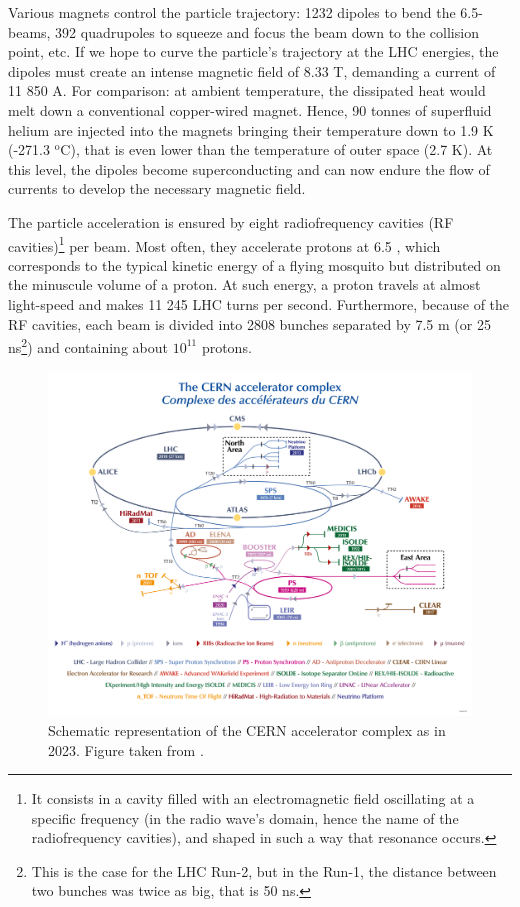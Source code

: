 Various magnets control the particle trajectory: 1232 dipoles to bend the 6.5-\tev beams, 392 quadrupoles to squeeze and focus the beam down to the collision point, etc. If we hope to curve the particle's trajectory at the LHC energies, the dipoles must create an intense magnetic field of 8.33 T, demanding a current of 11 850 A. For comparison: at ambient temperature, the dissipated heat would melt down a conventional copper-wired magnet. Hence, 90 tonnes of superfluid helium are injected into the magnets bringing their temperature down to 1.9 K (-271.3 $^\text{o}$C), that is even lower than the temperature of outer space (2.7 K). At this level, the dipoles become superconducting and can now endure the flow of currents to develop the necessary magnetic field.

The particle acceleration is ensured by eight radiofrequency cavities (RF cavities)\footnote{It consists in a cavity filled with an electromagnetic field oscillating at a specific frequency (in the radio wave's domain, hence the name of the radiofrequency cavities), and shaped in such a way that resonance occurs.} per beam. Most often, they accelerate protons at 6.5 \tev, which corresponds to the typical kinetic energy of a flying mosquito but distributed on the minuscule volume of a proton. At such energy, a proton travels at almost light-speed and makes 11 245 LHC turns per second. Furthermore, because of the RF cavities, each beam is divided into 2808 bunches separated by 7.5 m (or 25 ns\footnote{This is the case for the LHC Run-2, but in the Run-1, the distance between two bunches was twice as big, that is 50 ns.}) and containing about $10^{11}$ protons. \\

\begin{figure}[t]
	\centering
	\includegraphics[width=1\textwidth]{Figs/Chapter3/CCC-v2022_Large.png}
	\caption{Schematic representation of the CERN accelerator complex as in 2023. Figure taken from \cite{lopienskaewaCERNAcceleratorComplex2022}.}
	\label{fig:AcceleratorComplex}
\end{figure}

